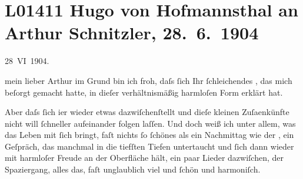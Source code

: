

\section[Hugo von Hofmannsthal an Arthur Schnitzler, 28. 6. 1904]{L01411 Hugo von Hofmannsthal an Arthur Schnitzler, 28. 6. 1904}
\nopagebreak{}
\rehead{ }\normalsize\beginnumbering{}
\toendnotes[C]{\smallbreak\pagebreak[2]}
\toendnotes[C]{\smallbreak}
\pstart
           \raggedleft{}{\pb}28 VI 1904.\pend
           
\pstart{}mein lieber Arthur\pend\vspace{0.5em}
\pstart
           im Grund bin ich froh, daſs ſich Ihr ſchleichendes \label{K_L01411-1v}\label{K_L01411-1}, das mich beſorgt
               gemacht hatte, in dieſer verhältnismäßig harmloſen Form erklärt hat.\pend
           
\pstart
           Aber daſs ſich i{\geminationm}er wieder etwas dazwiſchenſtellt und
               dieſe kleinen Zuſa{\geminationm}enkünfte nicht will ſchneller
               aufeinander folgen laſſen. Und doch {\pb}weiß ich unter allem, was das
               Leben mit ſich bringt, faſt nichts ſo ſchönes als ein Nachmittag wie der \label{K_L01411-2v}\label{K_L01411-2}, ein Geſpräch, das manchmal in die tiefſten Tiefen untertaucht und ſich dann
               wieder mit harmloſer Freude an der Oberfläche hält, ein paar Lieder dazwiſchen, {\pb}der Spaziergang, alles das, faſt
               unglaublich viel und ſchön und harmoniſch.\pend
           
